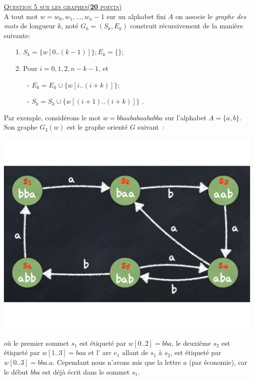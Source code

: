 %
%

\noindent
{\textsc{\underline{Question 5 sur les graphes(\textbf{20} points)}}}\\

A tout mot $w= w_0, w_1, \ldots, w_n-1$ sur un alphabet fini $A$ on associe le \emph{graphe des mots} de longueur $k$, not\'e $G_k = (S_k, E_k)$ construit r\'ecursivement de la mani\`ere suivante:\medskip 
\begin{itemize}
\item[1.] $S_k =  \{w[0..(k-1)]\}; E_k = \{ \}$; %
\item[2.] Pour $ i = 0,1,2, n - k-1 $,  et\smallskip
\begin{itemize}  
  \item[-] $E_k = E_k \cup \{w[i .. (i+ k)]\}$; 
  \item[-] $S_k = S_k \cup \{w[(i+1) ..  (i+ k)]\}$ .
\end{itemize}
\medskip
\end{itemize}
Par exemple, consid\'erons le mot $w= bbaababaababba$ sur l'alphabet $A =\{a,b\}$. Son graphe  $G_3(w)$ est le graphe orienté $G$ suivant~:
\vspace{-.75cm}
\begin{center}
    \includegraphics[width=3.5 in]{Figures/Graphe2.pdf} 
\end{center}
\vspace{-.75cm}
o\`u  le premier sommet  $s_1$ est  \'etiquet\'e par $w[0..2]=bba$, le deuxi\`eme  $s_2$ est \'etiquet\'e par $w[1..3]=baa$ et l' arc 
$e_1$ allant de $s_1$ \`a $s_2$, est étiqueté par $w[0..3] = bba.a$.
Cependant nous n'avons  mis que la lettre $a$ (par économie), car le début $bba$ est déjà écrit dans le sommet $s_1$.

